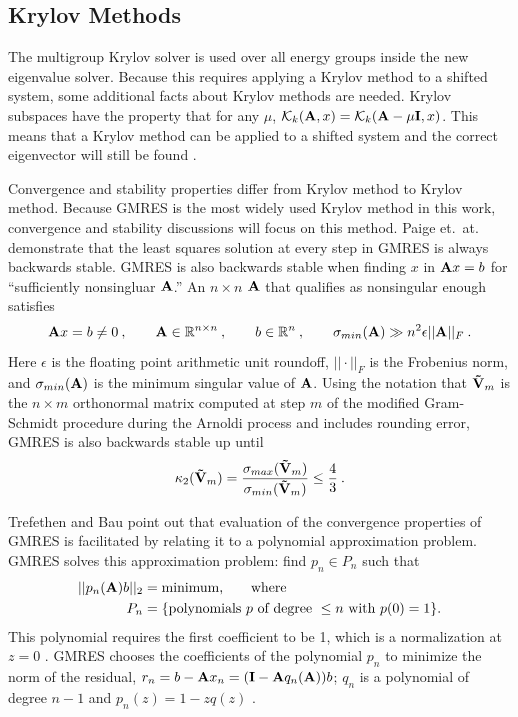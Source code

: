 \subsection{Krylov Methods}
The multigroup Krylov solver is used over all energy groups inside the new eigenvalue solver. Because this requires applying a Krylov method to a shifted system, some additional facts about Krylov methods are needed. Krylov subspaces have the property that for any $\mu$, $\mathcal{K}_k(\mathbf{A},x) = \mathcal{K}_k(\mathbf{A}- \mu \mathbf{I}, x)$. This means that a Krylov method can be applied to a shifted system and the correct eigenvector will still be found \cite{Stewart2001}. 

Convergence and stability properties differ from Krylov method to Krylov method. Because GMRES is the most widely used Krylov method in this work, convergence and stability discussions will focus on this method. Paige et.\ at.\  \cite{Paige2006} demonstrate that the least squares solution at every step in GMRES is always backwards stable. GMRES is also backwards stable when finding $x$ in $\mathbf{A}x = b$ for ``sufficiently nonsingluar $\mathbf{A}$.'' An $n \times n$ $\mathbf{A}$ that qualifies as nonsingular enough satisfies
%
\begin{equation}
  \mathbf{A}x = b \ne 0\:, \qquad \mathbf{A} \in \mathbb{R}^{n \times n} \:, \qquad b\in \mathbb{R}^{n} \:, \qquad \sigma_{min}(\mathbf{A}) \gg n^{2}\epsilon ||\mathbf{A}||_{F} \:.
\end{equation}
%
Here $\epsilon$ is the floating point arithmetic unit roundoff, $|| \cdot ||_{F}$ is the Frobenius norm, and $\sigma_{min}(\mathbf{A})$ is the minimum singular value of $\mathbf{A}$. Using the notation that $\mathbf{\tilde V}_{m}$ is the $n \times m$ orthonormal matrix computed at step $m$ of the modified Gram-Schmidt procedure during the Arnoldi process and includes rounding error, GMRES is also backwards stable up until  \cite{Paige2006}
%
\begin{equation}
  \kappa_{2}(\mathbf{\tilde V}_{m}) = \frac{\sigma_{max}(\mathbf{\tilde V}_{m})}{\sigma_{min}(\mathbf{\tilde V}_{m})} \le \frac{4}{3} \:.
\end{equation}

Trefethen and Bau \cite{Trefethen1997} point out that evaluation of the convergence properties of GMRES is facilitated by relating it to a polynomial approximation problem. GMRES solves this approximation problem: find $p_{n} \in P_{n}$ such that 
%
\begin{align}
  ||p_{n}(\mathbf{A})b||_{2} &= \text{minimum,} \qquad \text{where}  \nonumber \\
  P_{n} &= \{ \text{polynomials } p \text{ of degree } \le n \text{ with } p(0)=1 \nonumber \}.
\end{align}
%
This polynomial requires the first coefficient to be 1, which is a normalization at $z=0$ . GMRES chooses the coefficients of the polynomial $p_{n}$ to minimize the norm of the residual, $r_{n} = b - \mathbf{A}x_{n} = (\mathbf{I} - \mathbf{A}q_{n} (\mathbf{A}) )b$; $q_{n}$ is a polynomial of degree $n-1$ and $p_{n}(z) = 1 - zq(z)$ \cite{Trefethen1997}.

